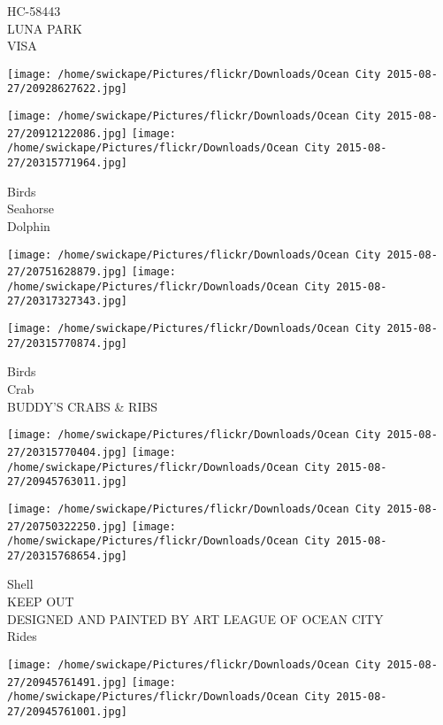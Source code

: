 \documentclass[10pt,letterpaper]{article}
\begin{document}
HC{-}58443\\
LUNA PARK\\
VISA\\
\pagebreak

\texttt{[image: /home/swickape/Pictures/flickr/Downloads/Ocean City 2015-08-27/20928627622.jpg]}

\vspace{0.25in}
\texttt{[image: /home/swickape/Pictures/flickr/Downloads/Ocean City 2015-08-27/20912122086.jpg]}
\texttt{[image: /home/swickape/Pictures/flickr/Downloads/Ocean City 2015-08-27/20315771964.jpg]}

Birds\\
Seahorse\\
Dolphin\\
\pagebreak

\texttt{[image: /home/swickape/Pictures/flickr/Downloads/Ocean City 2015-08-27/20751628879.jpg]}
\texttt{[image: /home/swickape/Pictures/flickr/Downloads/Ocean City 2015-08-27/20317327343.jpg]}

\vspace{0.25in}
\texttt{[image: /home/swickape/Pictures/flickr/Downloads/Ocean City 2015-08-27/20315770874.jpg]}

Birds\\
Crab\\
BUDDY'S CRABS \& RIBS\\
\pagebreak

\texttt{[image: /home/swickape/Pictures/flickr/Downloads/Ocean City 2015-08-27/20315770404.jpg]}
\texttt{[image: /home/swickape/Pictures/flickr/Downloads/Ocean City 2015-08-27/20945763011.jpg]}

\texttt{[image: /home/swickape/Pictures/flickr/Downloads/Ocean City 2015-08-27/20750322250.jpg]}
\texttt{[image: /home/swickape/Pictures/flickr/Downloads/Ocean City 2015-08-27/20315768654.jpg]}

Shell\\
KEEP OUT\\
DESIGNED AND PAINTED BY ART LEAGUE OF OCEAN CITY\\
Rides\\
\pagebreak

\texttt{[image: /home/swickape/Pictures/flickr/Downloads/Ocean City 2015-08-27/20945761491.jpg]}
\texttt{[image: /home/swickape/Pictures/flickr/Downloads/Ocean City 2015-08-27/20945761001.jpg]}
\end{document}
